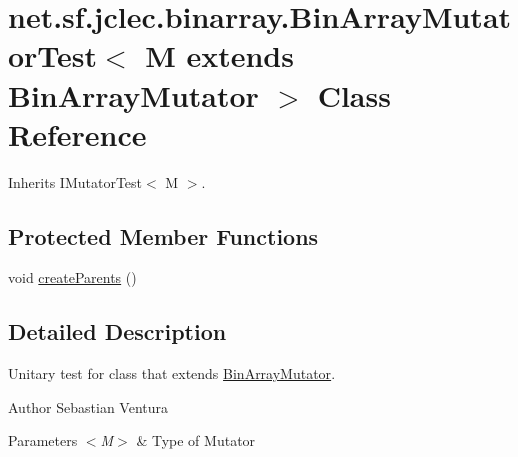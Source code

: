 \hypertarget{classnet_1_1sf_1_1jclec_1_1binarray_1_1_bin_array_mutator_test_3_01_m_01extends_01_bin_array_mutator_01_4}{\section{net.\-sf.\-jclec.\-binarray.\-Bin\-Array\-Mutator\-Test$<$ M extends Bin\-Array\-Mutator $>$ Class Reference}
\label{classnet_1_1sf_1_1jclec_1_1binarray_1_1_bin_array_mutator_test_3_01_m_01extends_01_bin_array_mutator_01_4}
}


Inherits I\-Mutator\-Test$<$ M $>$.

\subsection*{Protected Member Functions}
\begin{DoxyCompactItemize}
\item 
void \hyperlink{classnet_1_1sf_1_1jclec_1_1binarray_1_1_bin_array_mutator_test_3_01_m_01extends_01_bin_array_mutator_01_4_a3e0bd4e6510091465a54cd9b972de180}{create\-Parents} ()
\end{DoxyCompactItemize}


\subsection{Detailed Description}
Unitary test for class that extends \hyperlink{classnet_1_1sf_1_1jclec_1_1binarray_1_1_bin_array_mutator}{Bin\-Array\-Mutator}.

\begin{DoxyAuthor}{Author}
Sebastian Ventura
\end{DoxyAuthor}

\begin{DoxyParams}{Parameters}
{\em $<$\-M$>$} & Type of Mutator \\
\hline
\end{DoxyParams}



